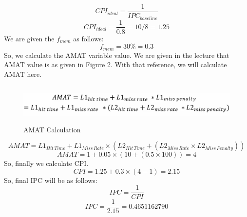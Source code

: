 \documentclass[12pt]{article}
\begin{document}
\begin{equation*}
    CPI_{ideal} = \frac{1}{IPC_{baseline}}
\end{equation*}
\begin{equation*}
    CPI_{ideal} = \frac{1}{0.8} = 10/8 = 1.25
\end{equation*}
We are given the $f_{mem}$ as follows: \\
\begin{equation*}
    f_{mem} = 30 \% = 0.3
\end{equation*}
So, we calculate the AMAT variable value. We are given in the lecture that AMAT value is as given in Figure 2. With that reference, we will calculate AMAT here.
\begin{figure}
    \centering
    \includegraphics[width = 15cm, height = 2cm]{Assignment-12/Formula2.png}
    \caption{AMAT Calculation}
\end{figure}
\begin{equation*}
    AMAT = L1_{Hit \, Time} + L1_{Miss \, Rate} \times (L2_{Hit \, Time} + (L2_{Miss \, Rate} \times L2_{Miss \, Penalty}))
\end{equation*}
\begin{equation*}
    AMAT = 1 + 0.05 \times (10 + (0.5 \times 100)) = 4
\end{equation*}
So, finally we calculate CPI.
\begin{equation*}
    CPI = 1.25 + 0.3 \times (4 - 1) = 2.15
\end{equation*}
So, final IPC will be as follows: 
\begin{equation*}
    IPC = \frac{1}{CPI}
\end{equation*}
\begin{equation*}
    IPC = \frac{1}{2.15} = 0.4651162790
\end{equation*}

\section{}
\end{document}
